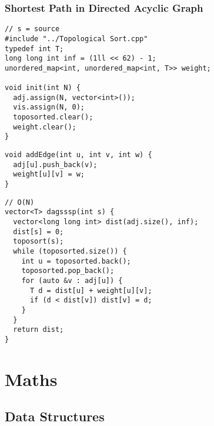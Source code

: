 \documentclass[twoside]{article}
\begin{document}
\begin{multicols*}{2}
\subsubsectionfont{\large\bfseries\sffamily\underline}
\subsubsection*{Shortest Path in Directed Acyclic Graph}
\begin{verbatim}
// s = source
#include "../Topological Sort.cpp"
typedef int T;
long long int inf = (1ll << 62) - 1;
unordered_map<int, unordered_map<int, T>> weight;

void init(int N) {
  adj.assign(N, vector<int>());
  vis.assign(N, 0);
  toposorted.clear();
  weight.clear();
}
\end{verbatim}
\vspace{-12pt}
\begin{verbatim}
void addEdge(int u, int v, int w) {
  adj[u].push_back(v);
  weight[u][v] = w;
}
\end{verbatim}
\vspace{-12pt}
\begin{verbatim}
// O(N)
vector<T> dagsssp(int s) {
  vector<long long int> dist(adj.size(), inf);
  dist[s] = 0;
  toposort(s);
  while (toposorted.size()) {
    int u = toposorted.back();
    toposorted.pop_back();
    for (auto &v : adj[u]) {
      T d = dist[u] + weight[u][v];
      if (d < dist[v]) dist[v] = d;
    }
  }
  return dist;
}
\end{verbatim}

\sectionfont{\bfseries\sffamily\centering\Huge}
\vspace{1em}
\section*{Maths}
\vspace{3em}
\subsectionfont{\bfseries\sffamily\centering\LARGE}
\vspace{0em}
\subsection*{Data Structures}
\vspace{2em}
\subsubsectionfont{\large\bfseries\sffamily\underline}

\end{multicols*}
\end{document}
